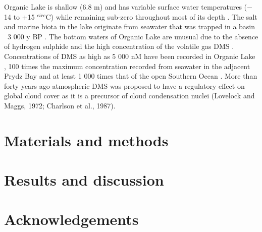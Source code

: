 Organic Lake is shallow (6.8 m) and has variable surface water temperatures ($-$14 to $+$15 $^{circ}$C) while remaining sub-zero throughout most of its depth \cite{Franzman1987b, Gibson1991, Roberts1993, Gibson1999}.
The salt and marine biota in the lake originate from seawater that was trapped in a basin ~3 000 y BP \cite{Zwartz1988, Bird1991}. 
The bottom waters of Organic Lake are unusual due to the absence of hydrogen sulphide and the high concentration of the volatile gas \ac{DMS} \cite{Deprez1986, Franzmann,1987b, Gibson1991, Roberts1993a, Roberts1993b}. 
Concentrations of \ac{DMS} as high as 5 000 nM have been recorded in Organic Lake \cite{Gibson1991}, 100 times the maximum concentration recorded from seawater in the adjacent Prydz Bay and at least 1 000 times that of the open Southern Ocean \cite{Curran1998}.
More than forty years ago atmospheric DMS was proposed to have a regulatory effect on global cloud cover as it is a precursor of cloud condensation nuclei (Lovelock and Maggs, 1972; Charlson et al., 1987).


\section{Materials and methods}



\section{Results and discussion}


\section{Acknowledgements}
